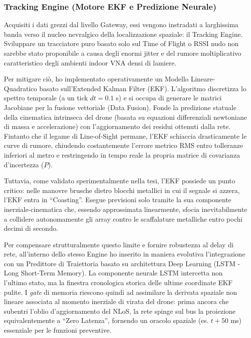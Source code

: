 \documentclass[twoside]{article}
\begin{document}
\subsubsection{Tracking Engine (Motore EKF e Predizione Neurale)}

Acquisiti i dati grezzi dal livello Gateway, essi vengono instradati a larghissima banda verso il nucleo nevralgico della localizzazione spaziale: il Tracking Engine. Sviluppare un tracciatore puro basato solo sul Time of Flight o RSSI nudo non sarebbe stato proponibile a causa degli enormi jitter e del rumore moltiplicativo caratteristico degli ambienti indoor VNA densi di lamiere.

Per mitigare ciò, ho implementato operativamente un Modello Lineare-Quadratico basato sull'Extended Kalman Filter (EKF). L'algoritmo discretizza lo spettro temporale (a un tick $dt = 0.1$ s) e si occupa di generare le matrici Jacobiane per la fusione vettoriale (Data Fusion). Fonde la predizione statuale della cinematica intrinseca del drone (basata su equazioni differenziali newtoniane di massa e accelerazione) con l'aggiornamento dei residui ottenuti dalla rete. Fintanto che il legame di Line-of-Sight permane, l'EKF schiaccia drasticamente le curve di rumore, chiudendo costantemente l'errore metrico RMS entro tolleranze inferiori al metro e restringendo in tempo reale la propria matrice di covarianza d'incertezza ($P$).

Tuttavia, come validato sperimentalmente nella tesi, l'EKF possiede un punto critico: nelle manovre brusche dietro blocchi metallici in cui il segnale si azzera, l'EKF entra in ``Coasting''. Esegue previsioni solo tramite la sua componente inerziale-cinematica che, essendo approssimata linearmente, sfocia inevitabilmente a collidere autonomamente gli array contro le scaffalature metalliche entro pochi decimi di secondo.

Per compensare strutturalmente questo limite e fornire robustezza al delay di rete, all'interno dello stesso Engine ho inserito in maniera evolutiva l'integrazione con un Predittore di Traiettoria basato su architettura Deep Learning (LSTM - Long Short-Term Memory). La componente neurale LSTM intercetta non l'ultimo stato, ma la finestra cronologica storica delle ultime coordinate EKF pulite. I \textit{gate} di memoria riescono quindi ad assimilare la derivata spaziale non lineare associata al momento inerziale di virata del drone: prima ancora che subentri l'oblio d'aggiornamento del NLoS, la rete spinge sul bus la proiezione equivalentemente a ``Zero Latenza'', fornendo un oracolo spaziale (es. $t + 50$ ms) essenziale per le funzioni preventive.
\end{document}
